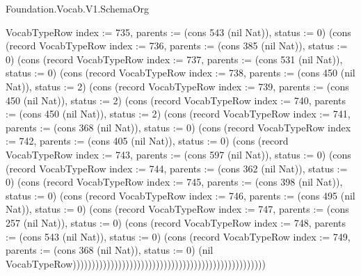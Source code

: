 \begin{lexlean}{Foundation.Vocab.V1.SchemaOrg}
\begin{semanticmodule}
{VocabTypeRow {index := 735, parents := (cons 543 (nil Nat)), status := 0}) (cons (record VocabTypeRow {index := 736, parents := (cons 385 (nil Nat)), status := 0}) (cons (record VocabTypeRow {index := 737, parents := (cons 531 (nil Nat)), status := 0}) (cons (record VocabTypeRow {index := 738, parents := (cons 450 (nil Nat)), status := 2}) (cons (record VocabTypeRow {index := 739, parents := (cons 450 (nil Nat)), status := 2}) (cons (record VocabTypeRow {index := 740, parents := (cons 450 (nil Nat)), status := 2}) (cons (record VocabTypeRow {index := 741, parents := (cons 368 (nil Nat)), status := 0}) (cons (record VocabTypeRow {index := 742, parents := (cons 405 (nil Nat)), status := 0}) (cons (record VocabTypeRow {index := 743, parents := (cons 597 (nil Nat)), status := 0}) (cons (record VocabTypeRow {index := 744, parents := (cons 362 (nil Nat)), status := 0}) (cons (record VocabTypeRow {index := 745, parents := (cons 398 (nil Nat)), status := 0}) (cons (record VocabTypeRow {index := 746, parents := (cons 495 (nil Nat)), status := 0}) (cons (record VocabTypeRow {index := 747, parents := (cons 257 (nil Nat)), status := 0}) (cons (record VocabTypeRow {index := 748, parents := (cons 543 (nil Nat)), status := 0}) (cons (record VocabTypeRow {index := 749, parents := (cons 368 (nil Nat)), status := 0}) (nil VocabTypeRow)))))))))))))))))))))))))))))))))))))))))))))))))))
}


\end{semanticmodule}
\end{lexlean}
